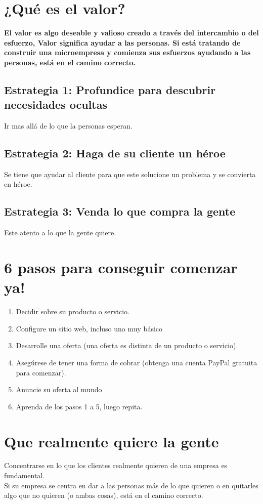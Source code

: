 \documentclass[10pt]{book}
\begin{document}
	\section{¿Qué es el valor?}

	\textbf{El valor es algo deseable y valioso creado a través del intercambio o del esfuerzo, Valor significa ayudar a las personas. Si está tratando de construir una microempresa y comienza sus esfuerzos ayudando a las personas, está en el camino correcto.}

	    \subsection{Estrategia 1: Profundice para descubrir necesidades ocultas}
	    Ir mas allá de lo que la personas esperan.

	    \subsection{Estrategia 2: Haga de su cliente un héroe}
	    Se tiene que ayudar al cliente para que este solucione un problema y se convierta en héroe.
	    \subsection{Estrategia 3: Venda lo que compra la gente}
	    Este atento a lo que la gente quiere.

    \section{6 pasos para conseguir comenzar ya!}	
	\begin{enumerate}[\bfseries 1.]
	    \item Decidir sobre su producto o servicio. 
	    \item Configure un sitio web, incluso uno muy básico 
	    \item Desarrolle una oferta (una oferta es distinta de un producto o servicio).
	    \item Asegúrese de tener una forma de cobrar (obtenga una cuenta PayPal gratuita para comenzar). 
	    \item Anuncie su oferta al mundo 
	    \item Aprenda de los pasos 1 a 5, luego repita.
	\end{enumerate}

	\section{Que realmente quiere la gente}
	Concentrarse en lo que los clientes realmente quieren de una empresa es fundamental.\\
	Si su empresa se centra en dar a las personas más de lo que quieren o en quitarles algo que no quieren (o ambas cosas), está en el camino correcto.
\end{document}
